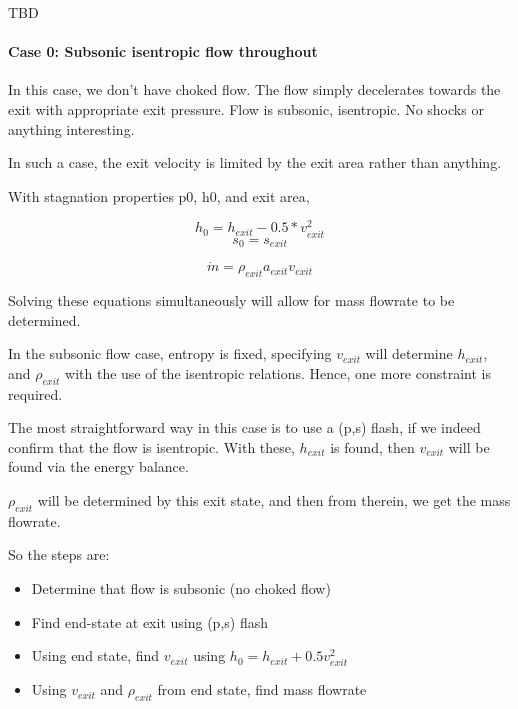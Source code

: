 \documentclass[masters]{ucbthesis}
\renewcommand{\_}{\kern-1.5pt\textunderscore\kern-1.5pt}
\begin{document}
TBD

\paragraph{Case 0: Subsonic isentropic flow throughout}

In this case, we don't have choked flow. The flow simply decelerates towards 
the exit with appropriate exit pressure. Flow is subsonic, isentropic.
No shocks or anything interesting.

In such a case, the exit velocity is limited by the exit area rather than 
anything. 

With stagnation properties p0, h0, and exit area,

\begin{equation*}
	h_0 = h_{exit} - 0.5 * v_{exit}^2
\end{equation*}
\begin{equation*}
	s_0 = s_{exit}
\end{equation*}


\begin{equation*}
	\dot{m} = \rho_{exit} a_{exit} v_{exit}
\end{equation*}

Solving these equations simultaneously will allow for mass flowrate to be 
determined.

In the subsonic flow case, entropy is fixed, specifying $v_{exit}$ will 
determine $h_{exit}$, and $\rho_{exit}$ with the use of the isentropic 
relations. Hence, one more constraint is required.

The most straightforward way in this case is to use a (p,s) flash, 
if we indeed confirm that the flow is isentropic. 
With these, $h_{exit}$ is found, then $v_{exit}$ will be found via 
the energy balance. 

$\rho_{exit}$ will be determined by this exit state, and then from therein,
we get the mass flowrate. 

So the steps are:

\begin{itemize}
	\item Determine that flow is subsonic (no choked flow)
	\item Find end-state at exit using (p,s) flash 
	\item Using end state, find $v_{exit}$ using $h_0 = h_{exit} + 0.5 v_{exit}^2$
	\item Using $v_{exit}$ and $\rho_{exit}$ from end state, find mass flowrate
\end{itemize}
\end{document}
